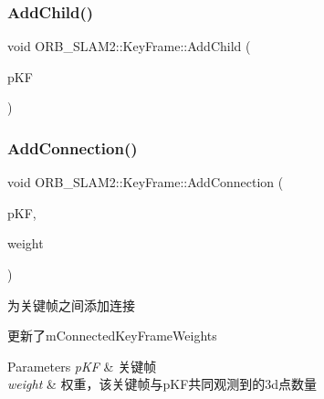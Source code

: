 \subsubsection{\texorpdfstring{Add\+Child()}{AddChild()}}
{\footnotesize\ttfamily void O\+R\+B\+\_\+\+S\+L\+A\+M2\+::\+Key\+Frame\+::\+Add\+Child (\begin{DoxyParamCaption}\item[{\mbox{\hyperlink{class_o_r_b___s_l_a_m2_1_1_key_frame}{Key\+Frame}} $\ast$}]{p\+KF }\end{DoxyParamCaption})}

\mbox{\label{class_o_r_b___s_l_a_m2_1_1_key_frame_a8d21a23485b7c104a73d6ad3cccf4e93}} 
\subsubsection{\texorpdfstring{Add\+Connection()}{AddConnection()}}
{\footnotesize\ttfamily void O\+R\+B\+\_\+\+S\+L\+A\+M2\+::\+Key\+Frame\+::\+Add\+Connection (\begin{DoxyParamCaption}\item[{\mbox{\hyperlink{class_o_r_b___s_l_a_m2_1_1_key_frame}{Key\+Frame}} $\ast$}]{p\+KF,  }\item[{const int \&}]{weight }\end{DoxyParamCaption})}



为关键帧之间添加连接 

更新了m\+Connected\+Key\+Frame\+Weights 
\begin{DoxyParams}{Parameters}
{\em p\+KF} & 关键帧 \\
\hline
{\em weight} & 权重，该关键帧与p\+K\+F共同观测到的3d点数量 \\
\hline
\end{DoxyParams}
\mbox{\label{class_o_r_b___s_l_a_m2_1_1_key_frame_aca519e7486b0e6f1fd6c98d7ced920b8}} 
